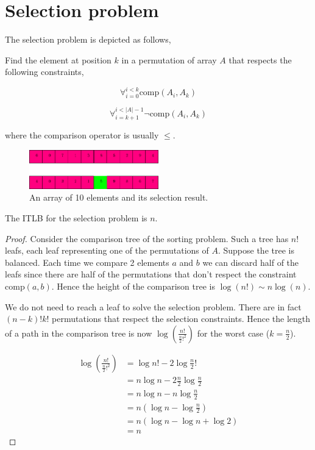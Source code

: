 \chapter{Selection problem}
\label{tree:S}

The selection problem is depicted as follows,

Find the element at position $k$ in a permutation of array $A$ that respects the following constraints,

\begin{equation}
\forall_{i = 0}^{i < k} \text{comp}(A_i, A_k)
\end{equation}

\begin{equation}
\forall_{i = k + 1}^{i < |A| - 1} \neg\text{comp}(A_i, A_k)
\end{equation}

where the comparison operator is usually $\leq$.\\


\begin{figure}
	\centering
	\includegraphics[width=0.5\textwidth]{fig/selection:array}
	\caption{\label{fig:selection:array} An array of 10 elements and its selection result.}
\end{figure}


\begin{theorem}
The ITLB for the selection problem is $n$.
\end{theorem}

\begin{proof}
Consider the comparison tree of the sorting problem.
Such a tree has $n!$ leafs, each leaf representing one of the permutations of $A$.
Suppose the tree is balanced.
Each time we compare 2 elements $a$ and $b$ we can discard half of the leafs since there are half of the permutations that don't respect the constraint $\text{comp}(a, b)$.
Hence the height of the comparison tree is $\log(n!) \sim n \log(n)$.

We do not need to reach a leaf to solve the selection problem.
There are in fact $(n-k)!k!$ permutations that respect the selection constraints.
Hence the length of a path in the comparison tree is now $\log(\frac{n!}{\frac{n}{2}!^2})$
for the worst case ($k = \frac{n}{2}$).

\begin{align*}
\log(\frac{n!}{\frac{n}{2}!^2})	&= \log n! - 2 \log \frac{n}{2}! \\
								&= n \log n - 2\frac{n}{2} \log \frac{n}{2} \\
								&= n \log n - n \log \frac{n}{2} \\
								&= n(\log n - \log \frac{n}{2}) \\
								&= n(\log n - \log n + \log 2) \\
								&= n
\end{align*}
\end{proof}

